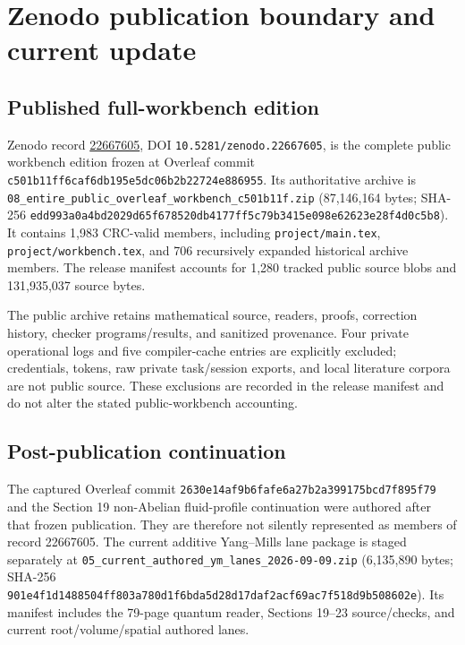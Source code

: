 \section{Zenodo publication boundary and current
update}\label{zenodo-publication-boundary-20260909-md-zenodo-publication-boundary-and-current-update}

\subsection{Published full-workbench
edition}\label{zenodo-publication-boundary-20260909-md-published-full-workbench-edition}

Zenodo record \href{https://zenodo.org/records/22667605}{22667605}, DOI
\texttt{10.5281/zenodo.22667605}, is the complete public workbench
edition frozen at Overleaf commit
\texttt{c501b11ff6caf6db195e5dc06b2b22724e886955}. Its authoritative
archive is
\texttt{08\_entire\_public\_overleaf\_workbench\_c501b11f.zip}
(87,146,164 bytes; SHA-256
\texttt{edd993a0a4bd2029d65f678520db4177ff5c79b3415e098e62623e28f4d0c5b8}).
It contains 1,983 CRC-valid members, including
\texttt{project/main.tex}, \texttt{project/workbench.tex}, and 706
recursively expanded historical archive members. The release manifest
accounts for 1,280 tracked public source blobs and 131,935,037 source
bytes.

The public archive retains mathematical source, readers, proofs,
correction history, checker programs/results, and sanitized provenance.
Four private operational logs and five compiler-cache entries are
explicitly excluded; credentials, tokens, raw private task/session
exports, and local literature corpora are not public source. These
exclusions are recorded in the release manifest and do not alter the
stated public-workbench accounting.

\subsection{Post-publication
continuation}\label{zenodo-publication-boundary-20260909-md-post-publication-continuation}

The captured Overleaf commit
\texttt{2630e14af9b6fafe6a27b2a399175bcd7f895f79} and the Section 19
non-Abelian fluid-profile continuation were authored after that frozen
publication. They are therefore not silently represented as members of
record 22667605. The current additive Yang--Mills lane package is staged
separately at \texttt{05\_current\_authored\_ym\_lanes\_2026-09-09.zip}
(6,135,890 bytes; SHA-256
\texttt{901e4f1d1488504ff803a780d1f6bda5d28d17daf2acf69ac7f518d9b508602e}).
Its manifest includes the 79-page quantum reader, Sections 19--23
source/checks, and current root/volume/spatial authored lanes.

